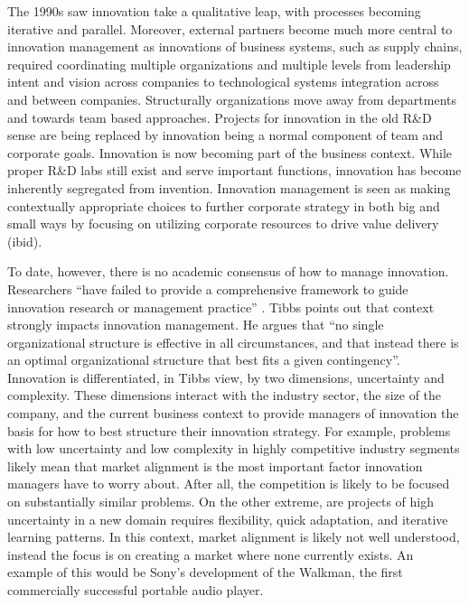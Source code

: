 \documentclass[man]{apa7}
\begin{document}
The 1990s saw innovation take a qualitative leap, with processes becoming iterative and parallel. Moreover, external partners become much more central to innovation management as innovations of business systems, such as supply chains, required coordinating multiple organizations and multiple levels from leadership intent and vision across companies to technological systems integration across and between companies. Structurally organizations move away from departments and towards team based approaches. Projects for innovation in the old R\&D sense are being replaced by innovation being a normal component of team and corporate goals. Innovation is now becoming part of the business context. While proper R\&D labs still exist and serve important functions, innovation has become inherently segregated from invention. Innovation management is seen as making contextually appropriate choices to further corporate strategy in both big and small ways by focusing on utilizing corporate resources to drive value delivery (ibid).

To date, however, there is no academic consensus of how to manage innovation. Researchers ``have failed to provide a comprehensive framework to guide innovation research or management practice'' \parencite{tiddInnovationManagementContext2001}. Tibbs points out that context strongly impacts innovation management. He argues that ``no single organizational structure is effective in all circumstances, and that instead there is an optimal organizational structure that best fits a given contingency''.  Innovation is differentiated, in Tibbs view, by two dimensions, uncertainty and complexity. These dimensions interact with the industry sector, the size of the company, and the current business context to provide managers of innovation the basis for how to best structure their innovation strategy. For example, problems with low uncertainty and low complexity in highly competitive industry segments likely mean that market alignment is the most important factor innovation managers have to worry about. After all, the competition is likely to be focused on substantially similar problems. On the other extreme, are projects of high uncertainty in a new domain requires flexibility, quick adaptation, and iterative learning patterns. In this context, market alignment is likely not well understood, instead the focus is on creating a market where none currently exists. An example of this would be Sony's development of the Walkman, the first commercially successful portable audio player.
\end{document}
